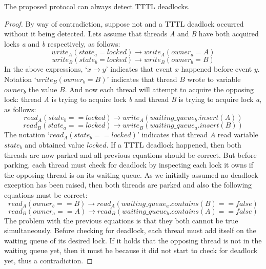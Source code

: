 \begin{lemma}
The proposed protocol can always detect TTTL deadlocks.
\end{lemma}
\begin{proof}
By way of contradiction, suppose not and a TTTL deadlock occurred without it being detected.
Lets assume that threads \emph{A} and \emph{B} have both acquired locks \emph{a} and \emph{b} respectively, as follows:
\begin{equation}
write_{A}(state_{a} = locked) \rightarrow write_{A}(owner_{a} = A)
\end{equation}
\begin{equation}
write_{B}(state_{b} = locked) \rightarrow write_{B}(owner_{b} = B)
\end{equation}
In the above expressions, `$x \rightarrow y$' indicates that event $x$ happened before event $y$. Notation `$write_{B}(owner_{b} = B)$' indicates that thread $B$ wrote to variable $owner_{b}$ the value $B$. 
And now each thread will attempt to acquire the opposing lock: thread \emph{A} is trying to acquire lock \emph{b} and thread \emph{B} is trying to acquire lock \emph{a}, as follows:
\begin{equation}
read_{A}(state_{b} == locked) \rightarrow write_{A}(waiting\_queue_{b}.insert(A))
\end{equation}
\begin{equation}
read_{B}(state_{a} == locked) \rightarrow write_{B}(waiting\_queue_{a}.insert(B))
\end{equation}
The notation `$read_{A}(state_{b} == locked)$' indicates that thread $A$ read variable $state_{b}$ and obtained value $locked$.
If a TTTL deadlock happened, then both threads are now parked and all previous equations should be correct.
But before parking, each thread must check for deadlock by inspecting each lock it owns if the opposing thread is on its waiting queue.
As we initially assumed no deadlock exception has been raised, then both threads are parked and also the following equations must be correct:
\begin{equation}
read_{A}(owner_{b} == B) \rightarrow read_{A}(waiting\_queue_{a}.contains(B) == false)
\end{equation}
\begin{equation}
read_{B}(owner_{a} == A) \rightarrow read_{B}(waiting\_queue_{b}.contains(A) == false)
\end{equation}
The problem with the previous equations is that they both cannot be true simultaneously.
Before checking for deadlock, each thread must add itself on the waiting queue of its desired lock.
If it holds that the opposing thread is not in the waiting queue yet, then it must be because it did not start to check for deadlock yet, thus a contradiction.
\end{proof}

